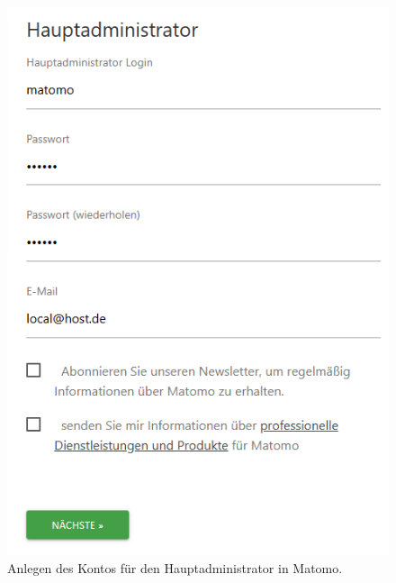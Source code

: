 \begin{figure}[H]
    \centering
    \begin{minipage}{0.49\textwidth}
        \centering
        \includegraphics[width=\linewidth, keepaspectratio]{images/haupadministrator.png}
        \caption{Anlegen des Kontos für den Hauptadministrator in Matomo.}
        \label{fig:hauptadministrator}
    \end{minipage}
    \hfill
    \begin{minipage}{0.49\textwidth}
        \centering

\end{minipage}
\end{figure}
